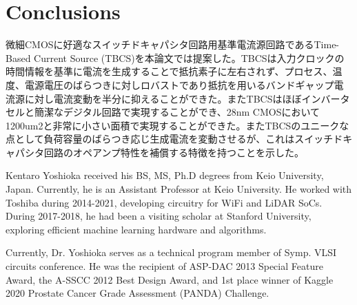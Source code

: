 \documentclass[letterpaper, 10 pt, conference]{ieeeconf}  %
\begin{document}
\section{Conclusions}
微細CMOSに好適なスイッチドキャパシタ回路用基準電流源回路であるTime-Based Current Source (TBCS)を本論文では提案した。TBCSは入力クロックの時間情報を基準に電流を生成することで抵抗素子に左右されず、プロセス、温度、電源電圧のばらつきに対しロバストであり抵抗を用いるバンドギャップ電流源に対し電流変動を半分に抑えることができた。またTBCSはほぼインバータセルと簡潔なデジタル回路で実現することができ、28nm CMOSにおいて1200um2と非常に小さい面積で実現することができた。またTBCSのユニークな点として負荷容量のばらつき応じ生成電流を変動させるが、これはスイッチドキャパシタ回路のオペアンプ特性を補償する特徴を持つことを示した。





\begin{IEEEbiography}
{Kentaro Yoshioka}
received his BS, MS, Ph.D degrees from Keio University, Japan. Currently, he is an Assistant Professor at Keio University. He worked with Toshiba during 2014-2021, developing circuitry for WiFi and LiDAR SoCs. During 2017-2018, he had been a visiting scholar at Stanford University, exploring efficient machine learning hardware and algorithms. 

Currently, Dr. Yoshioka serves as a technical program member of Symp. VLSI circuits conference. He was the recipient of ASP-DAC 2013 Special Feature Award, the A-SSCC 2012 Best Design Award, and 1st place winner of Kaggle 2020 Prostate Cancer Grade Assessment (PANDA) Challenge.
\end{IEEEbiography}
\end{document}
